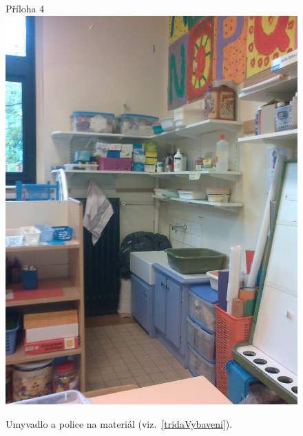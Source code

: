 	\begin{figure}[tb]
		\centering
		Příloha 4\\
		\includegraphics[height = 0.35\textheight]{./fotky/Obr4.jpg}
		\caption{
			Umyvadlo a police na materiál (viz.~\ref{tridaVybaveni}).
		}
		\label{Obr4}
	\end{figure}

